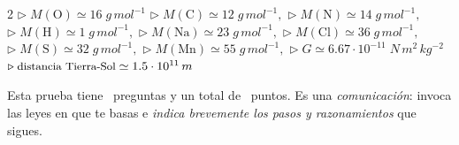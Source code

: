 \documentclass[a4paper,addpoints, 14pt]{exam}
\newcommand*\chem[1]{\ensuremath{\mathrm{#1}}}
\begin{document}
\boxedpoints


\begin{learn}
\begin{multicols}{2}
{$\triangleright\; M(\chem{O})\simeq16\;g\,mol^{-1}$\newline
$\triangleright\; M(\chem{C})\simeq12\;g\,mol^{-1},$\newline
$\triangleright\; M(\chem{N})\simeq14\;g\,mol^{-1},$\newline
$\triangleright\; M(\chem{H})\simeq1\;g\,mol^{-1},$\newline
$\triangleright\; M(\chem{Na})\simeq 23\;g\,mol^{-1},$\newline
$\triangleright\; M(\chem{Cl})\simeq 36\;g\,mol^{-1},$\newline
$\triangleright\; M(\chem{S})\simeq32\;g\,mol^{-1},$\newline
$\triangleright\; M(\chem{Mn})\simeq55\;g\,mol^{-1},$\newline
$\triangleright\; G\simeq 6.67\cdot 10^{-11}\;N\,m^2\,kg^{-2}$\newline
$\triangleright\; {\small\text{distancia Tierra-Sol}}\simeq 1.5\cdot 10^{11}\,m$
}
\end{multicols}
\end{learn}	

\vspace*{1ex}

\begin{problemas}{Esta prueba tiene \numquestions\ preguntas y un total de 
\numpoints\  puntos. Es una  \textit{comunicación}: invoca las leyes en que te basas e \textit{indica brevemente los pasos y razonamientos} que sigues.}
\end{problemas}



\vspace*{5ex}
\end{document}
